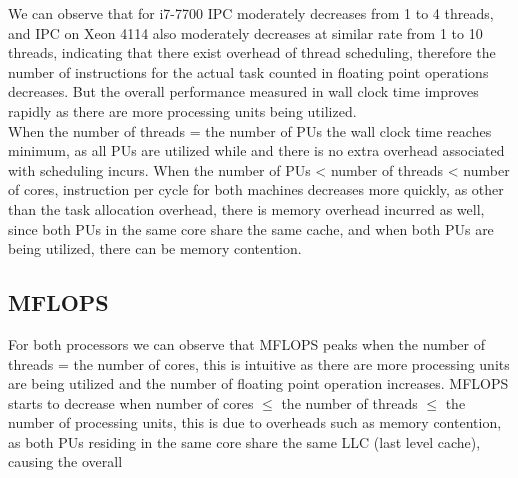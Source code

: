 \documentclass[a4paper]{article}
\begin{document}
We can observe that for i7-7700 IPC moderately decreases from 1 to 4 threads, and IPC on Xeon 4114 
also moderately decreases at similar rate from 1 to 10 threads,
indicating that there exist overhead of thread scheduling, therefore the number of instructions 
for the actual task counted in floating point operations decreases. But the overall performance measured in wall 
clock time improves rapidly as there are more processing units being utilized. \\
When the number of threads = the number of PUs the wall clock time reaches minimum, as all PUs are utilized while 
and there is no extra overhead associated with scheduling incurs. When the number of PUs < number of threads < number of cores, instruction per cycle for both
machines decreases more quickly, as other than the task allocation overhead, there is memory overhead incurred as well, since both PUs 
in the same core share the same cache, and when both PUs are being utilized, there can be memory contention. 
\par\vspace{3ex}
\subsection*{MFLOPS}
\begin{minipage}{0.5\linewidth}
    \noindent{}
\end{minipage}\hfill
\begin{minipage}{0.4\linewidth}
For both processors we can observe that MFLOPS peaks when the number of threads
= the number of cores, this is intuitive as there are more processing units are being utilized and the number of floating 
point operation increases. MFLOPS starts to decrease when number of cores $\leq$ the number of threads $\leq$ 
the number of processing units, this is due to overheads such as memory contention, as both PUs residing in the 
same core share the same LLC (last level cache), causing the overall 
\end{minipage}\hfill
\end{document}
